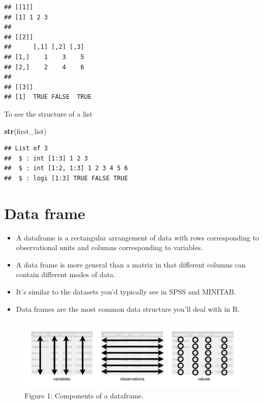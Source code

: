 \documentclass[]{book}
\newenvironment{Shaded}{\begin{snugshade}}{\end{snugshade}}
\newcommand{\KeywordTok}[1]{\textcolor[rgb]{0.13,0.29,0.53}{\textbf{#1}}}
\newcommand{\NormalTok}[1]{#1}
\begin{document}
\begin{verbatim}
## [[1]]
## [1] 1 2 3
## 
## [[2]]
##      [,1] [,2] [,3]
## [1,]    1    3    5
## [2,]    2    4    6
## 
## [[3]]
## [1]  TRUE FALSE  TRUE
\end{verbatim}

To see the structure of a list

\begin{Shaded}
\begin{Highlighting}[]
\KeywordTok{str}\NormalTok{(first_list)}
\end{Highlighting}
\end{Shaded}

\begin{verbatim}
## List of 3
##  $ : int [1:3] 1 2 3
##  $ : int [1:2, 1:3] 1 2 3 4 5 6
##  $ : logi [1:3] TRUE FALSE TRUE
\end{verbatim}

\hypertarget{data-frame}{%
\section{Data frame}\label{data-frame}}

\begin{itemize}
\item
  A dataframe is a rectangular arrangement of data with rows corresponding to observational units and columns corresponding to variables.
\item
  A data frame is more general than a matrix in that different columns can contain different modes of data.
\item
  It's similar to the datasets you'd typically see in SPSS and MINITAB.
\item
  Data frames are the most common data structure you'll deal with in R.
\end{itemize}

\begin{figure}
\centering
\includegraphics{tidy-1.png}
\caption{Figure 1: Components of a dataframe.}
\end{figure}
\end{document}

